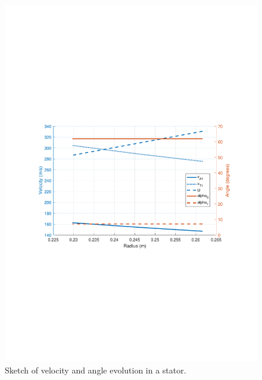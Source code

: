 \documentclass{beamer}
\begin{document}
\begin{frame}[t]
\begin{figure}[hbtp]
\caption{Sketch of velocity and angle evolution in a stator.}
\centering
\includegraphics[scale=0.6]{fig/velocity_span_example.pdf}
\end{figure}
\end{frame}
\end{document}
